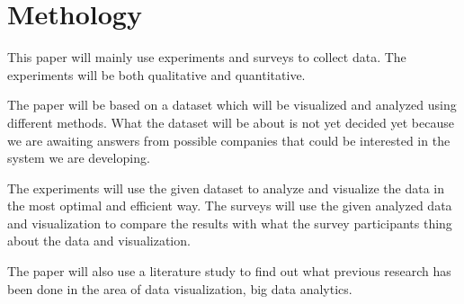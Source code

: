 \section{Methology}

This paper will mainly use experiments and surveys to collect data. 
The experiments will be both qualitative and quantitative.

The paper will be based on a dataset which will be visualized and analyzed
using different methods. What the dataset will be about is not yet decided yet 
because we are awaiting answers from possible companies that could 
be interested in the system we are developing.

The experiments will use the given dataset to analyze and visualize the
data in the most optimal and efficient way. The surveys will use 
the given analyzed data and visualization to compare the results with 
what the survey participants thing about the data and visualization.

The paper will also use a literature study to find out what previous 
research has been done in the area of data visualization, big data analytics.


